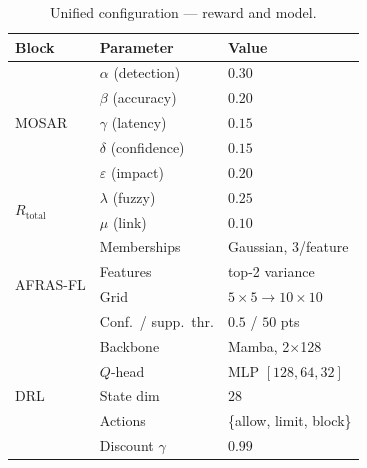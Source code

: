 \documentclass[ai,article,submit,moreauthors,pdftex]{Definitions/mdpi}
\newcommand{\rev}[1]{#1}
\begin{document}
\begin{table}[!htbp]
\centering
\rev{\caption{Unified configuration --- reward and model.}\label{tab:config}}
\rev{\footnotesize
\setlength{\tabcolsep}{4pt}
\begin{tabular}{@{}lll@{}}
\toprule
\textbf{Block} & \textbf{Parameter} & \textbf{Value} \\
\midrule
\multirow{5}{*}{MOSAR}
  & $\alpha$ (detection)      & $0.30$ \\
  & $\beta$  (accuracy)       & $0.20$ \\
  & $\gamma$ (latency)        & $0.15$ \\
  & $\delta$ (confidence)     & $0.15$ \\
  & $\varepsilon$ (impact)    & $0.20$ \\
\midrule
\multirow{2}{*}{$R_{\text{total}}$}
  & $\lambda$ (fuzzy)         & $0.25$ \\
  & $\mu$     (link)          & $0.10$ \\
\midrule
\multirow{4}{*}{AFRAS-FL}
  & Memberships               & Gaussian, 3/feature \\
  & Features                  & top-2 variance \\
  & Grid                      & $5{\times}5 \to 10{\times}10$ \\
  & Conf.\ / supp.\ thr.      & $0.5$ / $50$ pts \\
\midrule
\multirow{5}{*}{DRL}
  & Backbone                  & Mamba, 2$\times$128 \\
  & $Q$-head                  & MLP $[128,64,32]$ \\
  & State dim                 & $28$ \\
  & Actions                   & \{allow, limit, block\} \\
  & Discount $\gamma$         & $0.99$ \\
\bottomrule
\end{tabular}}
\end{table}
\end{document}
